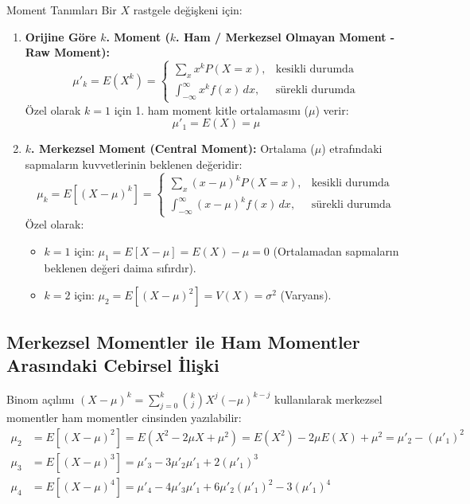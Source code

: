 \documentclass[12pt,a4paper]{article}
\begin{document}
\begin{tanim}{Moment Tanımları}
Bir $X$ rastgele değişkeni için:
\begin{enumerate}
    \item \textbf{Orijine Göre $k$. Moment ($k$. Ham / Merkezsel Olmayan Moment - Raw Moment):}
    \begin{equation}
        \mu'_k = E(X^k) = 
        \begin{cases}
            \sum_x x^k P(X = x), & \text{kesikli durumda} \\[0.5em]
            \int_{-\infty}^{\infty} x^k f(x) \, dx, & \text{sürekli durumda}
        \end{cases}
    \end{equation}
    Özel olarak $k=1$ için 1. ham moment kitle ortalamasını ($\mu$) verir:
    \begin{equation}
        \mu'_1 = E(X) = \mu
    \end{equation}

    \item \textbf{$k$. Merkezsel Moment (Central Moment):}
    Ortalama ($\mu$) etrafındaki sapmaların kuvvetlerinin beklenen değeridir:
    \begin{equation}
        \mu_k = E\left[(X - \mu)^k\right] = 
        \begin{cases}
            \sum_x (x - \mu)^k P(X = x), & \text{kesikli durumda} \\[0.5em]
            \int_{-\infty}^{\infty} (x - \mu)^k f(x) \, dx, & \text{sürekli durumda}
        \end{cases}
    \end{equation}
    Özel olarak:
    \begin{itemize}
        \item $k=1$ için: $\mu_1 = E[X - \mu] = E(X) - \mu = 0$ (Ortalamadan sapmaların beklenen değeri daima sıfırdır).
        \item $k=2$ için: $\mu_2 = E\left[(X - \mu)^2\right] = V(X) = \sigma^2$ (Varyans).
    \end{itemize}
\end{enumerate}
\end{tanim}

\subsection{Merkezsel Momentler ile Ham Momentler Arasındaki Cebirsel İlişki}
Binom açılımı $(X - \mu)^k = \sum_{j=0}^k \binom{k}{j} X^j (-\mu)^{k-j}$ kullanılarak merkezsel momentler ham momentler cinsinden yazılabilir:
\begin{align}
    \mu_2 &= E\left[(X - \mu)^2\right] = E(X^2 - 2\mu X + \mu^2) = E(X^2) - 2\mu E(X) + \mu^2 = \mu'_2 - (\mu'_1)^2 \\
    \mu_3 &= E\left[(X - \mu)^3\right] = \mu'_3 - 3\mu'_2 \mu'_1 + 2(\mu'_1)^3 \\
    \mu_4 &= E\left[(X - \mu)^4\right] = \mu'_4 - 4\mu'_3 \mu'_1 + 6\mu'_2 (\mu'_1)^2 - 3(\mu'_1)^4
\end{align}
\end{document}
